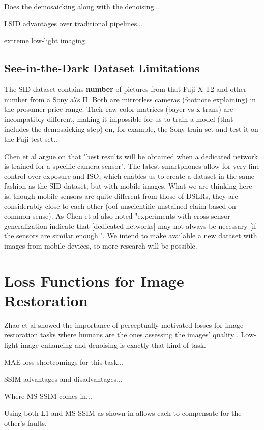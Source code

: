 Does the demosaicking along with the denoising...

LSID advantages over traditional pipelines...

extreme low-light imaging

\subsection{See-in-the-Dark Dataset Limitations}
The SID dataset contains \textbf{number} of pictures from that Fuji X-T2 and other number from a Sony a7s II.
Both are mirrorless cameras (footnote explaining) in the prosumer price range.
Their raw color matrices (bayer vs x-trans) are incompatibly different, making it impossible for us to train a model (that includes the demosaicking step) on, for example, the Sony train set and test it on the Fuji test set..

Chen et al argue on \cite{DBLP:conf/cvpr/ChenCXK18:lsid} that "best results will be obtained when a dedicated network is trained for a specific camera sensor".
The latest smartphones allow for very fine control over exposure and ISO, which enables us to create a dataset in the same fashion as the SID dataset, but with mobile images.
What we are thinking here is, though mobile sensors are quite different from those of DSLRs, they are considerably close to each other (oof unscientific unstained claim based on common sense).
As Chen et al also noted "experiments with cross-sensor generalization indicate that [dedicated networks] may not always be necessary [if the sensors are similar enough]".
We intend to make available a new dataset with images from mobile devices, so more research will be possible.

\section{Loss Functions for Image Restoration}
Zhao et al showed the importance of perceptually-motivated losses for image restoration tasks where humans are the ones assessing the images' quality \cite{DBLP:journals/tci/ZhaoGFK17:l1ssimloss}.
Low-light image enhancing and denoising is exactly that kind of task.

MAE loss shortcomings for this task...

SSIM advantages and disadvantages...

Where MS-SSIM comes in...

Using both L1 and MS-SSIM as shown in \cite{DBLP:journals/tci/ZhaoGFK17:l1ssimloss} allows each to compensate for the other's faults.


